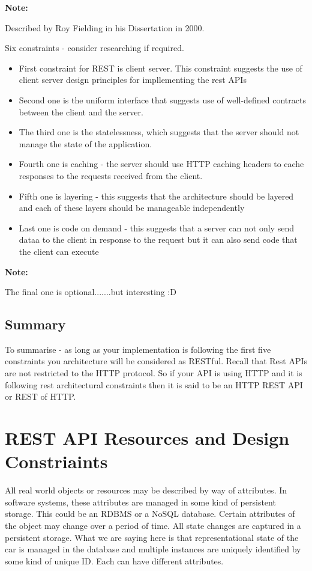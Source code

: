 \documentclass[a4paper, 11pt]{book}
\newenvironment{note}{
    \begin{siderule}
        \textbf{Note: }
        }{
    \end{siderule}
}
\begin{document}
    \begin{note}
        Described by Roy Fielding in his Dissertation in 2000.
    \end{note}

    Six constraints - consider researching if required.
    \begin{itemize}
        \item First constraint for REST is client server. This constraint suggests the use of client server design principles for impllementing the rest APIs
        \item Second one is the uniform interface that suggests use of well-defined contracts between the client and the server.
        \item The third one is the statelessness, which suggests that the server should not manage the state of the application.
        \item Fourth one is caching - the server should use HTTP caching headers to cache responses to the requests received from the client.
        \item Fifth one is layering - this suggests that the architecture should be layered and each of these layers should be manageable independently
        \item Last one is code on demand - this suggests that a server can not only send dataa to the client in response to the request but it can also send code that the client can execute
    \end{itemize}

    \begin{note}
        The final one is optional.......but interesting :D
    \end{note}

    \subsection{Summary}
    To summarise - as long as your implementation is following the first five constraints you architecture will be considered as RESTful.
    Recall that Rest APIs are not restricted to the HTTP protocol.
    So if your API is using HTTP and it is following rest architectural constraints then it is said to be an HTTP REST API or REST of HTTP.


    \section{REST API Resources and Design Constriaints}
    All real world objects or resources may be described by way of attributes.
    In software systems, these attributes are managed in some kind of persistent storage.
    This could be an RDBMS or a NoSQL database.
    Certain attributes of the object may change over a period of time.
    All state changes are captured in a persistent storage.
    What we are saying here is that representational state of the car is managed in the database and multiple instances are uniquely identified by some kind of unique ID.
    Each can have different attributes.
\end{document}
